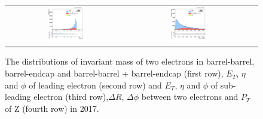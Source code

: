 \begin{figure}[ht]
\begin{center}
\begin{tabular}{ccc}
      \includegraphics[width=0.32\textwidth]{figures/Zprime/2017/complementary/h_Dphi_ll.png}&
      \includegraphics[width=0.32\textwidth]{figures/Zprime/2017/complementary/h_Ptll.png}\\
    \end{tabular}
    \caption{The distributions of invariant mass of two electrons in barrel-barrel, barrel-endcap and barrel-barrel + barrel-endcap (first row), $E_{T}$, $\eta$ and $\phi$ of leading electron (second row) and $E_{T}$, $\eta$ and $\phi$ of sub-leading electron (third row),$\Delta R$, $\Delta\phi$ between two electrons and $P_{T}$ of Z (fourth row) in 2017.
    \label{fig:complementary_2017}}
  \end{center}
\end{figure}


\clearpage

